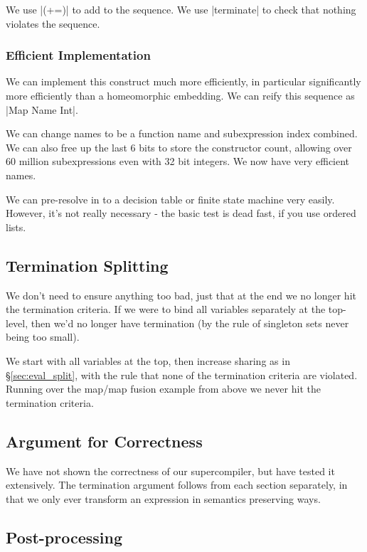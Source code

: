 \documentclass{sigplanconf}
\begin{document}
We use |(+=)| to add to the sequence. We use |terminate| to check that nothing violates the sequence.

\subsubsection{Efficient Implementation}

We can implement this construct much more efficiently, in particular significantly more efficiently than a homeomorphic embedding. We can reify this sequence as |Map Name Int|.

We can change names to be a function name and subexpression index combined. We can also free up the last 6 bits to store the constructor count, allowing over 60 million subexpressions even with 32 bit integers. We now have very efficient names.

We can pre-resolve in to a decision table or finite state machine very easily. However, it's not really necessary - the basic test is dead fast, if you use ordered lists.

\subsection{Termination Splitting}
\label{sec:term_split}

We don't need to ensure anything too bad, just that at the end we no longer hit the termination criteria. If we were to bind all variables separately at the top-level, then we'd no longer have termination (by the rule of singleton sets never being too small).

We start with all variables at the top, then increase sharing as in \S\ref{sec:eval_split}, with the rule that none of the termination criteria are violated. Running over the map/map fusion example from above we never hit the termination criteria.

\subsection{Argument for Correctness}

We have not shown the correctness of our supercompiler, but have tested it extensively. The termination argument follows from each section separately, in that we only ever transform an expression in semantics preserving ways.

\subsection{Post-processing}
\end{document}
